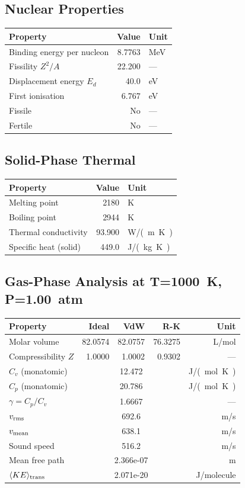 \documentclass[11pt,a4paper]{article}
\begin{document}
\subsection{Nuclear Properties}
\begin{tabular}{lrl}
  \toprule
  Property & Value & Unit \\
  \midrule
  Binding energy per nucleon & 8.7763 & \si{MeV} \\
  Fissility $Z^2/A$ & 22.200 & --- \\
  Displacement energy $E_d$ & 40.0 & \si{eV} \\
  First ionisation & 6.767 & \si{eV} \\
  Fissile & No & --- \\
  Fertile & No & --- \\
  \bottomrule
\end{tabular}

\subsection{Solid-Phase Thermal}
\begin{tabular}{lrl}
  \toprule
  Property & Value & Unit \\
  \midrule
  Melting point & 2180 & \si{K} \\
  Boiling point & 2944 & \si{K} \\
  Thermal conductivity & 93.900 & \si{W/(m.K)} \\
  Specific heat (solid) & 449.0 & \si{J/(kg.K)} \\
  \bottomrule
\end{tabular}

\subsection{Gas-Phase Analysis at T=\SI{1000}{K}, P=\SI{1.00}{atm}}
\begin{tabular}{lrrrr}
  \toprule
  Property & Ideal & VdW & R-K & Unit \\
  \midrule
  Molar volume & 82.0574 & 82.0757 & 76.3275 & \si{L/mol} \\
  Compressibility $Z$ & 1.0000 & 1.0002 & 0.9302 & --- \\
  \midrule
  $C_v$ (monatomic) & \multicolumn{3}{c}{12.472} & \si{J/(mol.K)} \\
  $C_p$ (monatomic) & \multicolumn{3}{c}{20.786} & \si{J/(mol.K)} \\
  $\gamma = C_p/C_v$ & \multicolumn{3}{c}{1.6667} & --- \\
  $v_{\rm rms}$ & \multicolumn{3}{c}{692.6} & \si{m/s} \\
  $v_{\rm mean}$ & \multicolumn{3}{c}{638.1} & \si{m/s} \\
  Sound speed & \multicolumn{3}{c}{516.2} & \si{m/s} \\
  Mean free path & \multicolumn{3}{c}{2.366e-07} & \si{m} \\
  $\langle KE \rangle_{\rm trans}$ & \multicolumn{3}{c}{2.071e-20} & \si{J/molecule} \\
  \bottomrule
\end{tabular}
\end{document}
